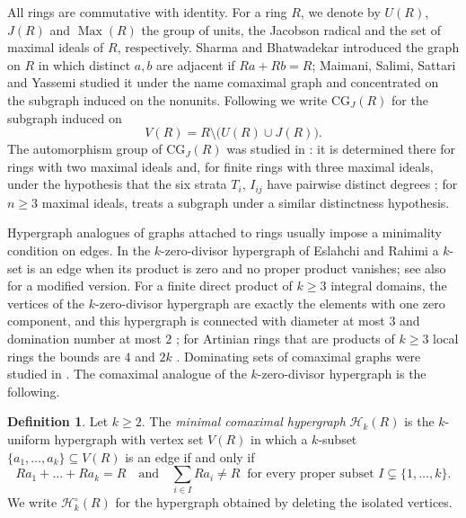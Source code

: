 \documentclass{amsart}
\theoremstyle{definition}
\newtheorem{definition}[theorem]{Definition}
\theoremstyle{remark}
\newcommand{\Max}{\operatorname{Max}}
\newcommand{\CG}{\mathrm{CG}_J}
\newcommand{\cH}{\mathcal{H}}
\begin{document}
All rings are commutative with identity. For a ring $R$, we denote by $U(R)$, $J(R)$ and $\Max(R)$ the group of units, the Jacobson radical and the set of maximal ideals of $R$, respectively. Sharma and Bhatwadekar \cite{SB95} introduced the graph on $R$ in which distinct $a,b$ are adjacent if $Ra+Rb=R$; Maimani, Salimi, Sattari and Yassemi \cite{MSSY08} studied it under the name comaximal graph and concentrated on the subgraph induced on the nonunits. Following \cite{KMR25} we write $\CG(R)$ for the subgraph induced on
\[
V(R)=R\setminus\bigl(U(R)\cup J(R)\bigr).
\]
The automorphism group of $\CG(R)$ was studied in \cite{KMR25}: it is determined there for rings with two maximal ideals \cite[Proposition~3.6]{KMR25} and, for finite rings with three maximal ideals, under the hypothesis that the six strata $T_i$, $I_{ij}$ have pairwise distinct degrees \cite[Corollary~3.10]{KMR25}; for $n\ge3$ maximal ideals, \cite[Theorem~3.9]{KMR25} treats a subgraph under a similar distinctness hypothesis.

Hypergraph analogues of graphs attached to rings usually impose a minimality condition on edges. In the $k$-zero-divisor hypergraph of Eslahchi and Rahimi \cite{ER07} a $k$-set is an edge when its product is zero and no proper product vanishes; see also \cite{HB12} for a modified version. For a finite direct product of $k\ge3$ integral domains, the vertices of the $k$-zero-divisor hypergraph are exactly the elements with one zero component, and this hypergraph is connected with diameter at most $3$ and domination number at most $2$ \cite[Lemma~2.1, Theorem~2.1]{MNR23}; for Artinian rings that are products of $k\ge3$ local rings the bounds are $4$ and $2k$ \cite[Theorem~2.2]{MNR23}. Dominating sets of comaximal graphs were studied in \cite{MNR15}. The comaximal analogue of the $k$-zero-divisor hypergraph is the following.

\begin{definition}\label{def:H}
Let $k\ge 2$. The \emph{minimal comaximal hypergraph} $\cH_k(R)$ is the $k$-uniform hypergraph with vertex set $V(R)$ in which a $k$-subset $\{a_1,\dots,a_k\}\subseteq V(R)$ is an edge if and only if
\[
Ra_1+\dots+Ra_k=R \quad\text{and}\quad \sum_{i\in I}Ra_i\ne R\ \text{ for every proper subset } I\subsetneq\{1,\dots,k\}.
\]
We write $\cH_k^{\circ}(R)$ for the hypergraph obtained by deleting the isolated vertices.
\end{definition}
\end{document}
